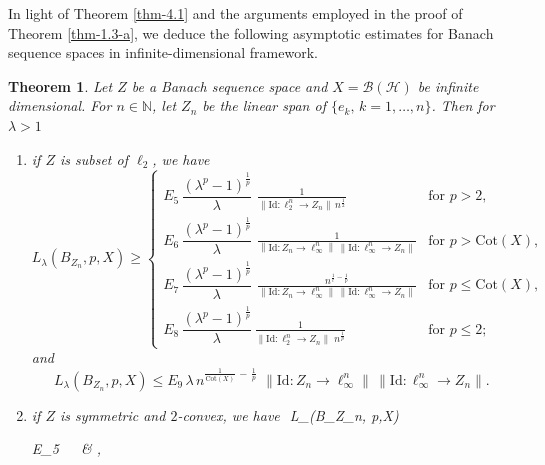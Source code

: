 \documentclass[a4paper,11pt, reqno]{amsart}
\newtheorem{thm}{Theorem}[section]
\theoremstyle{definition}
\newcommand{\norm}[1]{\left\lVert#1\right\rVert}
\begin{document}
In light of Theorem \ref{thm-4.1} and the arguments employed in the proof of Theorem \ref{thm-1.3-a}, we deduce the following asymptotic estimates for Banach sequence spaces in infinite-dimensional framework. 
\begin{thm} \label{thm-1.6}
	Let $Z$ be a Banach sequence space and $X=\mathcal{B}(\mathcal{H})$ be infinite dimensional. For $n\in \mathbb{N}$, let $Z_{n}$ be the linear span of $\{e_{k}, \, k=1,\ldots,n\}$. Then for $\lambda>1$
	\begin{enumerate}
		\item if $Z$ is subset of $\ell_2$, we have 
		$$  L_{\lambda}(B_{Z_{n}}, p,X) \geq \begin{cases}
			E_{5}\, \dfrac{\left(\lambda^p -1\right)^{\frac{1}{p}}}{\lambda}\, \,  \frac{1}{ \|\mathrm{Id}:\ell_2^n\to Z_n\|\, n^{\frac{1}{2}}} & \text{for $p > 2$}, \\[2mm]
			
			E_{6}\,\dfrac{\left(\lambda^p -1\right)^{\frac{1}{p}}}{\lambda}\, \,  \frac{1}{ \norm{\mathrm{Id}: Z_n \rightarrow \ell^n_\infty}\,\|\mathrm{Id}:\ell_\infty^n\to Z_n\|} & \text{for $p>\mathrm{Cot}(X)$}, \\[2mm]
			E_{7}\, \dfrac{\left(\lambda^p -1\right)^{\frac{1}{p}}}{\lambda}\,  \, \frac{ n^{\frac{1}{t}-\frac{1}{p}}}{\|\mathrm{Id}: Z_n\to \ell_\infty^n\|\,\|\mathrm{Id}:\ell_\infty^n\to Z_n\|} & \text{for $p\leq  \mathrm{Cot}(X)$},\\[2mm]
			E_{8}\, \dfrac{\left(\lambda^p -1\right)^{\frac{1}{p}}}{\lambda}\,   \frac{1}{ \|\mathrm{Id}:\ell_2^n\to Z_n\|\, \, n^{\frac{1}{p}}} & \text{for $p \leq 2$};
		\end{cases}$$
		and
		\begin{equation*}
			L_{\lambda}(B_{Z_n}, p,X) \leq 	
			E_9\,\lambda\, n^{\frac{1}{\mathrm{Cot}(X)}\, - \,\frac{1}{p}}\,\, \| \mathrm{Id}: Z_n \to \ell_\infty^n \|\, \|\mathrm{Id}: \ell_\infty^n \to Z_n\|. 
		\end{equation*}
		\item if $Z$ is symmetric and $2$-convex, we have $$  L_{\lambda}(B_{Z_{n}}, p,X) \geq \begin{cases}
			E_{5}\, \, \,  \frac{1}{ \norm{\sum_{k=1}^{n}e^{*}_{k}}_{Z^{*}}} & , \\[2mm]
			

\end{cases}
\end{enumerate}
\end{thm}
\end{document}
